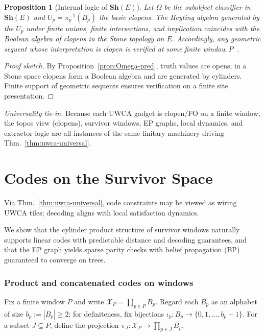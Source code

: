 \documentclass[12pt]{article}
\newtheorem{proposition}[theorem]{Proposition}
\numberwithin{equation}{section}
\begin{document}
\begin{proposition}[Internal logic of $\mathbf{Sh}(E)$]\label{prop:internal-logic}
Let $\Omega$ be the subobject classifier in $\mathbf{Sh}(E)$ and $U_p=\pi_p^{-1}(B_p)$ the basic clopens. The Heyting algebra generated by the $U_p$ under finite unions, finite intersections, and implication coincides with the Boolean algebra of clopens in the Stone topology on $E$. Accordingly, any geometric sequent whose interpretation is clopen is verified at some finite window $P$~\cite{SpivackUGPFormalization,ugp-lean}.
\end{proposition}

\begin{proof}[Proof sketch]
By Proposition~\ref{prop:Omega-pred}, truth values are opens; in a Stone space clopens form a Boolean algebra and are generated by cylinders. Finite support of geometric sequents ensures verification on a finite site presentation.
\end{proof}

\noindent\emph{Universality tie-in.} Because each UWCA gadget is clopen/FO on a finite window, the topos view (clopens), survivor windows, EP graphs, local dynamics, and extractor logic are all instances of the same finitary machinery driving Thm.~\ref{thm:uwca-universal}.

\section{Codes on the Survivor Space}\label{sec:codes}
Via Thm.~\ref{thm:uwca-universal}, code constraints may be viewed as wiring UWCA tiles; decoding aligns with local satisfaction dynamics.

We show that the cylinder product structure of survivor windows naturally supports linear codes with predictable distance and decoding guarantees, and that the EP graph yields sparse parity checks with belief propagation (BP) guaranteed to converge on trees.

\subsubsection{Product and concatenated codes on windows}\label{subsec:C4-product}
Fix a finite window $P$ and write $\mathscr{X}_P=\prod_{p\in P} B_p$. Regard each $B_p$ as an alphabet of size $b_p:=|B_p|\ge 2$; for definiteness, fix bijections $\iota_p:B_p\to\{0,1,\dots,b_p-1\}$. For a subset $J\subseteq P$, define the projection $\pi_J: \mathscr{X}_P\to \prod_{p\in J} B_p$.
\end{document}
